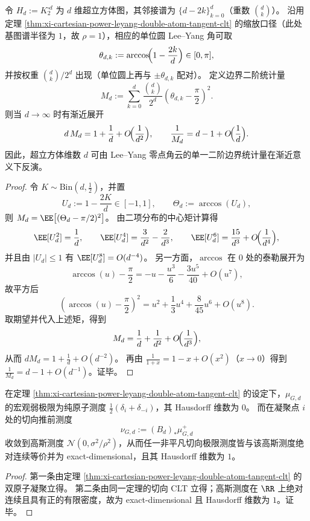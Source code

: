 \begin{theorem}[超立方体维数的边界二阶统计可读出性]\label{thm:xi-hypercube-dimension-readable-from-leyang-angular-variance}
令 \(H_d:=K_2^{\square d}\) 为 \(d\) 维超立方体图，其邻接谱为 \(\{d-2k\}_{k=0}^{d}\)（重数 \(\binom{d}{k}\)）。
沿用定理 \ref{thm:xi-cartesian-power-leyang-double-atom-tangent-clt} 的缩放口径（此处基图谱半径为 \(1\)，故 \(\rho=1\)），相应的单位圆 Lee--Yang 角可取
\[
\theta_{d,k}:=\arccos\!\Bigl(1-\frac{2k}{d}\Bigr)\in[0,\pi],
\]
并按权重 \(\binom{d}{k}/2^d\) 出现（单位圆上再与 \(\pm\theta_{d,k}\) 配对）。
定义边界二阶统计量
\[
M_d:=\sum_{k=0}^{d}\frac{\binom{d}{k}}{2^d}\left(\theta_{d,k}-\frac{\pi}{2}\right)^2.
\]
则当 \(d\to\infty\) 时有渐近展开
\[
d\,M_d=1+\frac1d+O\!\Bigl(\frac1{d^2}\Bigr),
\qquad
\frac1{M_d}=d-1+O\!\Bigl(\frac1d\Bigr).
\]
因此，超立方体维数 \(d\) 可由 Lee--Yang 零点角云的单一二阶边界统计量在渐近意义下反演。
\end{theorem}

\begin{proof}
令 \(K\sim\mathrm{Bin}(d,\tfrac12)\)，并置
\[
U_d:=1-\frac{2K}{d}\in[-1,1],
\qquad
\Theta_d:=\arccos(U_d),
\]
则 \(M_d=\EE\bigl[(\Theta_d-\pi/2)^2\bigr]\)。
由二项分布的中心矩计算得
\[
\EE[U_d^2]=\frac1d,
\qquad
\EE[U_d^4]=\frac{3}{d^2}-\frac{2}{d^3},
\qquad
\EE[U_d^6]=\frac{15}{d^3}+O\!\Bigl(\frac1{d^4}\Bigr),
\]
并且由 \(|U_d|\le 1\) 有 \(\EE[U_d^8]=O(d^{-4})\)。
另一方面，\(\arccos\) 在 \(0\) 处的泰勒展开为
\[
\arccos(u)-\frac{\pi}{2}
=-u-\frac{u^3}{6}-\frac{3u^5}{40}+O(u^7),
\]
故平方后
\[
\left(\arccos(u)-\frac{\pi}{2}\right)^2
=u^2+\frac13u^4+\frac{8}{45}u^6+O(u^8).
\]
取期望并代入上述矩，得到
\[
M_d=\frac1d+\frac1{d^2}+O\!\Bigl(\frac1{d^3}\Bigr),
\]
从而 \(dM_d=1+\frac1d+O(d^{-2})\)。
再由 \(\frac1{1+x}=1-x+O(x^2)\)（\(x\to 0\)）得到 \(\frac1{M_d}=d-1+O(d^{-1})\)。证毕。
\end{proof}

\begin{corollary}\label{cor:xi-leyang-tangent-dimension-resurrection}
在定理 \ref{thm:xi-cartesian-power-leyang-double-atom-tangent-clt} 的设定下，\(\mu_{G,d}\) 的宏观弱极限为纯原子测度 \(\tfrac12(\delta_i+\delta_{-i})\)，其 Hausdorff 维数为 \(0\)。
而在凝聚点 \(i\) 处的切向推前测度
\[
\nu_{G,d}:=(B_d)_*\mu_{G,d}^{+}
\]
收敛到高斯测度 \(\mathcal N(0,\sigma^2/\rho^2)\)，从而任一非平凡切向极限测度皆与该高斯测度绝对连续等价并为 exact-dimensional，且其 Hausdorff 维数为 \(1\)。
\end{corollary}

\begin{proof}
第一条由定理 \ref{thm:xi-cartesian-power-leyang-double-atom-tangent-clt} 的双原子凝聚立得。
第二条由同一定理的切向 CLT 立得；高斯测度在 \(\RR\) 上绝对连续且具有正的有限密度，故为 exact-dimensional 且 Hausdorff 维数为 \(1\)。证毕。
\end{proof}

